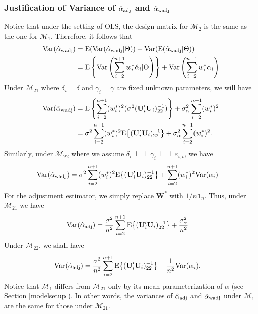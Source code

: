 \documentclass[11pt]{article}
\def\mbf#1{\mathbf{#1}} %
\newcommand{\indep}{\perp \!\!\! \perp } %
\def\mrm#1{\mathrm{#1}} %
\def\mc#1{\mathcal{#1}} %
\def\E#1{\mathrm{E}(#1)} %
\def\var#1{\mathrm{Var}(#1)} %
\theoremstyle{definition}
\begin{document}
\subsubsection{Justification of Variance of $\hat{\alpha}_{\rm adj}$ and $\hat{\alpha}_{\rm wadj}$}
\label{var}

Notice that under the setting of OLS, the design matrix for $\mc{M}_2$ is the same as the one for $\mc{M}_1$. Therefore, it follows that
  \begin{align*}
  \var{\hat{\alpha}_{\rm wadj}} 
  &= \E{\var{\hat{\alpha}_{\rm wadj}|\Theta}} + \var{\E{\hat{\alpha}_{\rm wadj}|\Theta}} \\
  &=\mrm{E} \left\{\mrm{Var}\left(\sum_{i=2}^{n+1} w_i^*\hat{\alpha}_i|\Theta\right)\right\} +\mrm{Var}\left(\sum_{i=2}^{n+1} w_i^*\alpha_i\right) 
\end{align*}
Under $\mc{M}_{21}$ where $\delta_i=\delta$ and $\gamma_i=\gamma$ are fixed unknown parameters,  we will have
  \begin{align}
  \var{\hat{\alpha}_{\rm wadj}} 
  &= \mrm{E} \left\{\sum_{i=2}^{n+1}(w_i^*)^2(\sigma^2(\mbf{U}'_i\mbf{U}_i)^{-1}_{22})\right\} +\sigma^2_{\alpha}\sum_{i=2}^{n+1}(w_i^*)^2  \nonumber\\
  &= \sigma^2\sum_{i=2}^{n+1}(w_i^*)^2\mrm{E}\big\{(\mbf{U}'_i\mbf{U}_i)^{-1}_{22}\big\}+\sigma^2_{\alpha}\sum_{i=2}^{n+1}(w_i^*)^2.\label{equation6}
\end{align}
Similarly, under $\mc{M}_{22}$ where we assume $\delta_i \indep \gamma_i \indep \varepsilon_{i,t}$, we have
 \begin{align*}
  \var{\hat{\alpha}_{\rm wadj}} 
  &= \sigma^2\sum_{i=2}^{n+1}(w_i^*)^2\mrm{E}\big\{(\mbf{U}'_i\mbf{U}_i)^{-1}_{22}\big\}
  + \sum_{i=2}^{n+1} (w_i^*)^2 \var{\alpha_i}
\end{align*}
For the adjustment estimator, we simply replace $\mbf{W}^*$ with $1/n\mbf{1}_n$. Thus, under $\mc{M}_{21}$ we have 
 \begin{align*}
  \var{\hat{\alpha}_{\rm adj}} 
  &=\frac{\sigma^2}{n^2}\sum_{i=2}^{n+1}\mrm{E}\big\{(\mbf{U}'_i\mbf{U}_i)^{-1}_{22}\big\}+\frac{\sigma^2_{\alpha}}{n^2}
\end{align*}
Under $\mc{M}_{22}$, we shall have
 \begin{align*}
  \var{\hat{\alpha}_{\rm adj}} 
  &=\frac{\sigma^2}{n^2}\sum_{i=2}^{n+1}\mrm{E}\big\{(\mbf{U}'_i\mbf{U}_i)^{-1}_{22}\big\}+\frac{1}{n^2}\var{\alpha_i}.
\end{align*}
Notice that $\mc{M}_{1}$ differs from $\mc{M}_{21}$ only by its mean parameterization of $\alpha$ (see Section \ref{modelsetup}). In other words, the variances of $\hat{\alpha}_{\rm adj}$ and $\hat{\alpha}_{\rm wadj}$ under $\mc{M}_1$ are the same for those under $\mc{M}_{21}$.
\end{document}
